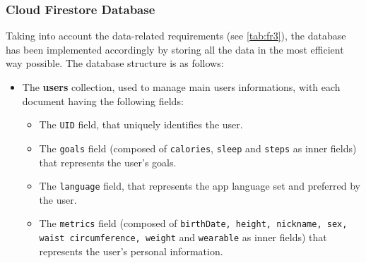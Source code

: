 \subsubsection{Cloud Firestore Database}
Taking into account the data-related requirements (see \cref{tab:fr3}), the database has been implemented accordingly by storing all the data in the most efficient way possible. \newline The database structure is as follows:

\begin{itemize}[nosep] %
    \item The \textbf{users} collection, used to manage main users informations, with each document having the following fields:
    \label{subsubsec:usersCollection}
    \begin{itemize}[nosep]
        \item The \texttt{UID} field, that uniquely identifies the user.
        \item The \texttt{goals} field (composed of \texttt{calories}, \texttt{sleep} and \texttt{steps} as inner fields) that represents the user's goals.
        \item The \texttt{language} field, that represents the app language set and preferred by the user.
        \item The \texttt{metrics} field (composed of \texttt{birthDate, height, nickname, sex, waist circumference, weight} and \texttt{wearable} as inner fields) that represents the user's personal information.
    \end{itemize}
\end{itemize}


